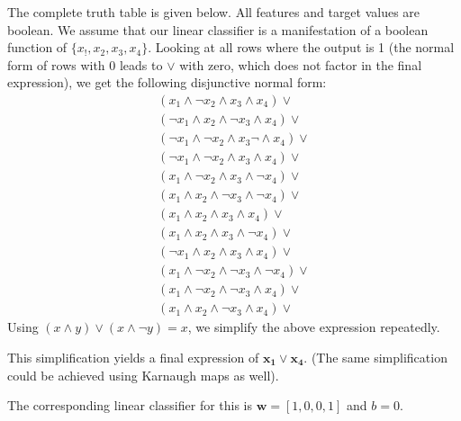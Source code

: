 \documentclass{article}
\begin{document}
\begin{enumerate}
    The complete truth table is given below. All features and target values are boolean. We assume that our linear classifier is a manifestation of a boolean function of $\{x_!, x_2, x_3, x_4\}$. Looking at all rows where the output is 1 (the normal form of rows with 0 leads to $\lor$ with zero, which does not factor in the final expression), we get the following disjunctive normal form:
    \begin{align*}
        (x_1 \land \lnot x_2 \land x_3 \land x_4) \lor \\
        (\lnot x_1 \land x_2 \land \lnot x_3 \land x_4) \lor \\
        (\lnot x_1 \land \lnot x_2 \land x_3 \lnot \land x_4) \lor \\
        (\lnot x_1 \land \lnot x_2 \land x_3 \land x_4) \lor \\
        (x_1 \land \lnot x_2 \land x_3 \land \lnot x_4) \lor \\
        (x_1 \land x_2 \land \lnot x_3 \land \lnot x_4) \lor \\
        (x_1 \land x_2 \land x_3 \land x_4) \lor \\
        (x_1 \land x_2 \land x_3 \land \lnot x_4) \lor \\
        (\lnot x_1 \land x_2 \land x_3 \land x_4) \lor \\
        (x_1 \land \lnot x_2 \land \lnot x_3 \land \lnot x_4) \lor \\
        (x_1 \land \lnot x_2 \land \lnot x_3 \land x_4) \lor \\
        (x_1 \land x_2 \land \lnot x_3 \land x_4) \lor 
    \end{align*}
    Using $(x \land y) \lor (x \land \lnot y) = x$, we simplify the above expression repeatedly.
    
    This simplification yields a final expression of $\mathbf{x_1 \lor x_4}$. (The same simplification could be achieved using Karnaugh maps as well).
    
    The corresponding linear classifier for this is 
    $\mathbf{w} = [1, 0, 0, 1]$ and $b = 0$. 
    
\end{enumerate}
\end{document}
